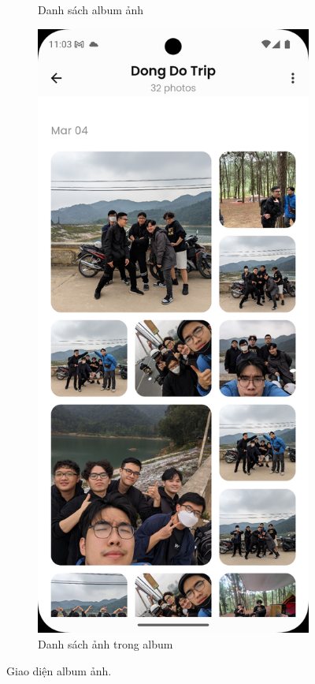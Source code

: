 \begin{figure}[H]
\begin{subfigure}{0.48\textwidth}
        \caption{Danh sách album ảnh}
    \end{subfigure}
    \hfill
    \begin{subfigure}{0.48\textwidth}
        \includegraphics[width=1\linewidth]{figures/c4/4-2/album_2.png} 
        \caption{Danh sách ảnh trong album}
    \end{subfigure}
    \caption{Giao diện album ảnh.}
    \label{fig:album}
\end{figure}

